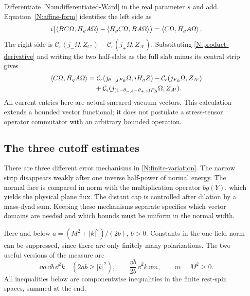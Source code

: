 Differentiate \eqref{N:undifferentiated-Ward} in the real parameter $s$
and add. Equation~\eqref{N:affine-form} identifies the left side as
\[
 i\bigl(\left\langle BC\Omega,H_gA\Omega\right\rangle
        -\left\langle H_gC\Omega,BA\Omega\right\rangle\bigr)
 =\left\langle C\Omega,H_gA\Omega\right\rangle.
\]
The right side is
$\mathcal C_\epsilon(j_-\Omega,Z_{C'})
-\mathcal C_\epsilon(j_+\Omega,Z_{A'})$.
Substituting \eqref{N:product-derivative} and writing the two half-slabs
as the full slab minus its central strip gives
\begin{align}\label{N:finite-variation}
 \left\langle C\Omega,H_gA\Omega\right\rangle
 &=\mathcal C_\epsilon(j_{\theta_{-,\delta}F_R}\Omega,iH_gZ)
   -\mathcal C_\epsilon(j_{F_R}\Omega,Z_{A'})\notag\\
 &\quad+
 \mathcal C_\epsilon
  (j_{(1-\theta_{-,\delta}-\theta_{+,\delta})F_R}\Omega,Z_{A'}).
\end{align}
All current entries here are actual smeared vacuum vectors. This
calculation extends a bounded vector functional; it does not postulate
a stress-tensor operator commutator with an arbitrary bounded operation.

\subsection{The three cutoff estimates}

There are three different error mechanisms in
\eqref{N:finite-variation}. The narrow strip disappears weakly after
one inverse half-power of normal energy. The normal face is compared
in norm with the multiplication operator $bg(Y)$, which yields the
physical plane flux. The distant cap is controlled after dilation by
a mass-dyad sum. Keeping these mechanisms separate specifies which
vector domains are needed and which bounds must be uniform in the
normal width.

Here and below $a=(M^2+|k|^2)/(2b)$, $b>0$.  Constants in the
one-field norm can be suppressed, since there are only finitely many
polarizations.  The two useful versions of the measure are
\begin{equation}\label{N:measure-coordinates}
 \dd a\,\dd b\,\dd^2k\quad(2ab\geq |k|^2),
 \qquad
 \frac{\dd b}{2b}\,\dd^2k\,\dd m,\qquad m=M^2\geq0.
\end{equation}
All inequalities below are componentwise inequalities in the finite
rest-spin spaces, summed at the end.

